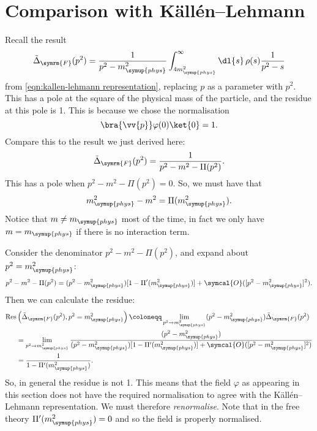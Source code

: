 \documentclass[fleqn]{NotesClass}
\DeclareMathOperator{\Res}{Res}
\newcommand{\feynman}{\symrm{F}}
\newcommand{\order}{\symcal{O}}
\newcommand{\phys}{\symup{phys}}
\begin{document}
    \section{Comparison with K\"all\'en--Lehmann}
    Recall the result
    \begin{equation}
        \tilde{\Delta}_{\feynman}(p^2) = \frac{1}{p^2 - m_{\phys}^2} \int_{4m_{\phys}^2}^{\infty} \dl{s} \, \rho(s) \frac{1}{p^2 - s}
    \end{equation}
    from \cref{eqn:kallen-lehmann representation}, replacing \(p\) as a parameter with \(p^2\).
    This has a pole at the square of the physical mass of the particle, and the residue at this pole is 1.
    This is because we chose the normalisation
    \begin{equation}
        \bra{\vv{p}} \varphi(0) \ket{0} = 1.
    \end{equation}
    Compare this to the result we just derived here:
    \begin{equation}
        \tilde{\Delta}_{\feynman}(p^2) = \frac{1}{p^2 - m^2 - \Pi(p^2)}.
    \end{equation}
    This has a pole when \(p^2 - m^2 - \Pi(p^2) = 0\).
    So, we must have that
    \begin{equation}
        m_{\phys}^2 - m^2 = \Pi(m_{\phys}^2).
    \end{equation}
    Notice that \(m \ne m_{\phys}\) most of the time, in fact we only have \(m = m_{\phys}\) if there is no interaction term.
    
    Consider the denominator \(p^2 - m^2 - \Pi(p^2)\), and expand about \(p^2 = m_{\phys}^2\):
    \begin{equation}
        p^2 - m^2 - \Pi(p^2) = (p^2 - m_{\phys}^2) [1 - \Pi'(m_{\phys}^2)] + \order([p^2 - m_{\phys}^2]^2).
    \end{equation}
    Then we can calculate the residue:
    \begin{align}
        \Res&\left( \tilde{\Delta}_{\feynman}(p^2), p^2 = m_{\phys}^2 \right) \coloneqq \lim_{p^2 \to m_{\phys}^2} (p^2 - m_{\phys}^2) \tilde{\Delta}_{\feynman}(p^2)\\
        &= \lim_{p^2 \to m_{\phys}^2} \frac{(p^2 - m_{\phys}^2)}{(p^2 - m_{\phys}^2)[1 - \Pi'(m_{\phys}^2)] + \order([p^2 - m_{\phys}^2]^2)}\\
        &= \frac{1}{1 - \Pi'(m_{\phys}^2)}.
    \end{align}
    So, in general the residue is not 1.
    This means that the field \(\varphi\) as appearing in this section does not have the required normalisation to agree with the K\"all\'en--Lehmann representation.
    We must therefore \emph{renormalise}.
    Note that in the free theory \(\Pi'(m_{\phys}^2) = 0\) and so the field is properly normalised.
    
\end{document}
